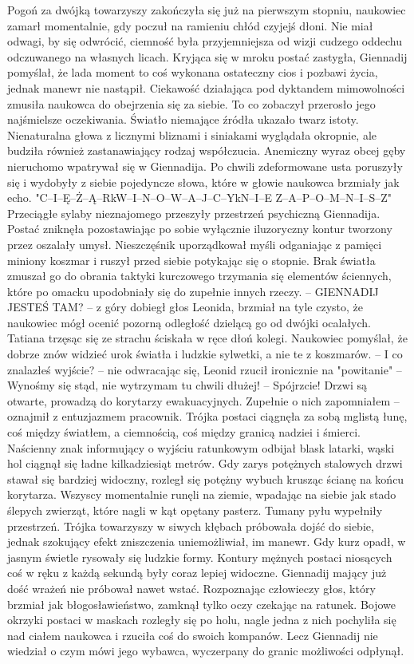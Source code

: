\documentclass[../MAIN.tex]{subfiles}
\begin{document}
Pogoń za dwójką towarzyszy zakończyła się już na pierwszym stopniu, naukowiec zamarł momentalnie, gdy poczuł na ramieniu chłód czyjejś dłoni. Nie miał odwagi, by się odwrócić, ciemność była przyjemniejsza od wizji cudzego oddechu odczuwanego na własnych licach. Kryjąca się w mroku postać zastygła, Giennadij pomyślał, że lada moment to coś wykonana ostateczny cios i pozbawi życia, jednak manewr nie nastąpił. Ciekawość działająca pod dyktandem mimowolności zmusiła naukowca do obejrzenia się za siebie. To co zobaczył przerosło jego najśmielsze oczekiwania. Światło niemające źródła ukazało twarz istoty. Nienaturalna głowa z licznymi bliznami i siniakami wyglądała okropnie, ale budziła również zastanawiający rodzaj współczucia. Anemiczny wyraz obcej gęby nieruchomo wpatrywał się w Giennadija. Po chwili zdeformowane usta poruszyły się i wydobyły z siebie pojedyncze słowa, które w głowie naukowca brzmiały jak echo. "C--I--Ę--Ż--Ą--R\3kW--I--N--O--W--A--J--C--Y\3kN--I--E Z--A--P--O--M--N--I--S--Z" 
Przeciągłe sylaby nieznajomego przeszyły przestrzeń psychiczną Giennadija. Postać zniknęła pozostawiając po sobie wyłącznie iluzoryczny kontur tworzony przez oszalały umysł. Nieszczęśnik uporządkował myśli odganiając z pamięci miniony koszmar i ruszył przed siebie potykając się o stopnie. Brak światła zmuszał go do obrania taktyki kurczowego trzymania się elementów ściennych, które po omacku upodobniały się do zupełnie innych rzeczy. 
-- GIENNADIJ JESTEŚ TAM? -- z góry dobiegł głos Leonida, brzmiał na tyle czysto, że naukowiec mógł ocenić pozorną odległość dzielącą go od dwójki ocalałych. 
Tatiana trzęsąc się ze strachu ściskała w ręce dłoń kolegi. Naukowiec pomyślał, że dobrze znów widzieć urok światła i ludzkie sylwetki, a nie te z koszmarów. 
-- I co znalazłeś wyjście? -- nie odwracając się, Leonid rzucił ironicznie na "powitanie" 
-- Wynośmy się stąd, nie wytrzymam tu chwili dłużej! 
-- Spójrzcie! Drzwi są otwarte, prowadzą do korytarzy ewakuacyjnych. Zupełnie o nich zapomniałem -- oznajmił z entuzjazmem pracownik.
Trójka postaci ciągnęła za sobą mglistą łunę, coś między światłem, a ciemnością, coś między granicą nadziei i śmierci. Naścienny znak informujący o wyjściu ratunkowym odbijał blask latarki, wąski hol ciągnął się ładne kilkadziesiąt metrów. Gdy zarys potężnych stalowych drzwi stawał się bardziej widoczny, rozległ się potężny wybuch krusząc ścianę na końcu korytarza. Wszyscy momentalnie runęli na ziemie, wpadając na siebie jak stado ślepych zwierząt, które nagli w kąt opętany pasterz. Tumany pyłu wypełniły przestrzeń. Trójka towarzyszy w siwych kłębach próbowała dojść do siebie, jednak szokujący efekt zniszczenia uniemożliwiał, im manewr. Gdy kurz opadł, w jasnym świetle rysowały się ludzkie formy. Kontury mężnych postaci niosących coś w ręku z każdą sekundą były coraz lepiej widoczne. Giennadij mający już dość wrażeń nie próbował nawet wstać. Rozpoznając człowieczy głos, który brzmiał jak błogosławieństwo, zamknął tylko oczy czekając na ratunek. Bojowe okrzyki postaci w maskach rozległy się po holu, nagle jedna z nich pochyliła się nad ciałem naukowca i rzuciła coś do swoich kompanów. Lecz Giennadij nie wiedział o czym mówi jego wybawca, wyczerpany do granic możliwości odpłynął. 
\end{document}

